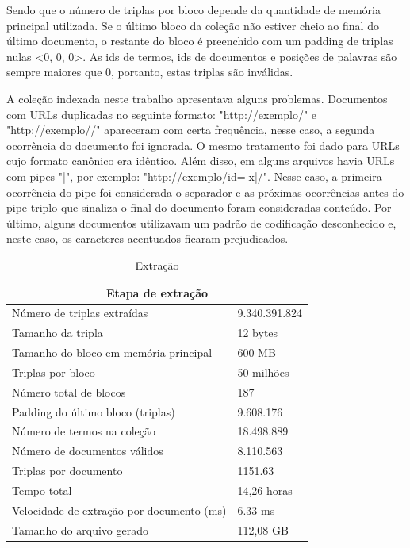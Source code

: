 \documentclass{report}
\begin{document}
Sendo que o número de triplas por bloco depende da quantidade de memória principal utilizada.
Se o último bloco da coleção não estiver cheio ao final do último documento, o restante do bloco é preenchido com 
um padding de triplas nulas <0, 0, 0>. As ids de termos, ids de documentos e posições de palavras são sempre maiores que 0, 
portanto, estas triplas são inválidas.

A coleção indexada neste trabalho apresentava alguns problemas. Documentos com URLs duplicadas no seguinte formato: 
"http://exemplo/" e "http://exemplo//" apareceram com certa frequência, nesse caso, a segunda ocorrência do documento foi ignorada.
O mesmo tratamento foi dado para URLs cujo formato canônico era idêntico. Além disso, em alguns arquivos havia URLs
com pipes "|", por exemplo: "http://exemplo/id=|x|/". Nesse caso, a primeira ocorrência do pipe foi considerada o separador
e as próximas ocorrências antes do pipe triplo que sinaliza o final do documento foram consideradas conteúdo. Por último,
alguns documentos utilizavam um padrão de codificação desconhecido e, neste caso, os caracteres acentuados ficaram prejudicados.

\begin{table}
\centering
\begin{tabular}{ |l|l| }
  \hline
  \multicolumn{2}{|c|}{Etapa de extração} \\
  \hline
  Número de triplas extraídas & 9.340.391.824 \\
  Tamanho da tripla & 12 bytes \\
  Tamanho do bloco em memória principal & 600 MB \\
  Triplas por bloco & 50 milhões \\
  Número total de blocos & 187 \\
  Padding do último bloco (triplas) & 9.608.176 \\
  Número de termos na coleção & 18.498.889 \\
  Número de documentos válidos & 8.110.563 \\
  Triplas por documento & 1151.63 \\
  Tempo total & 14,26 horas \\
  Velocidade de extração por documento (ms) & 6.33 ms \\
  Tamanho do arquivo gerado & 112,08 GB \\
  \hline
\end{tabular}
\caption{Extração}
\label{tab:extractor}
\end{table}
\end{document}
